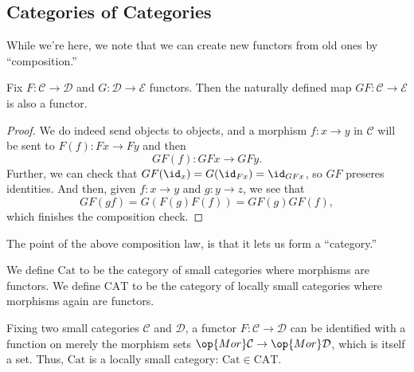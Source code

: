 \subsection{Categories of Categories}
While we're here, we note that we can create new functors from old ones by ``composition.''
\begin{proposition}
	Fix $F:\mathcal C\to\mathcal D$ and $G:\mathcal D\to\mathcal E$ functors. Then the naturally defined map $GF:\mathcal C\to\mathcal E$ is also a functor.
\end{proposition}
\begin{proof}
	We do indeed send objects to objects, and a morphism $f:x\to y$ in $\mathcal C$ will be sent to $F(f):Fx\to Fy$ and then
	\[GF(f):GFx\to GFy.\]
	Further, we can check that $GF(\id_x)=G(\id_{Fx})=\id_{GFx}$, so $GF$ preseres identities. And then, given $f:x\to y$ and $g:y\to z$, we see that
	\[GF(gf)=G(F(g)F(f))=GF(g)GF(f),\]
	which finishes the composition check.
\end{proof}
The point of the above composition law, is that it lets us form a ``category.''
\begin{definition}
	We define $\mathrm{Cat}$ to be the category of small categories where morphisms are functors. We define $\mathrm{CAT}$ to be the category of locally small categories where morphisms again are functors.
\end{definition}
\begin{remark}
	Fixing two small categories $\mathcal C$ and $\mathcal D$, a functor $F:\mathcal C\to\mathcal D$ can be identified with a function on merely the morphism sets $\op{Mor}\mathcal C\to\op{Mor}\mathcal D$, which is itself a set. Thus, $\mathrm{Cat}$ is a locally small category: $\mathrm{Cat}\in\mathrm{CAT}$.
\end{remark}

